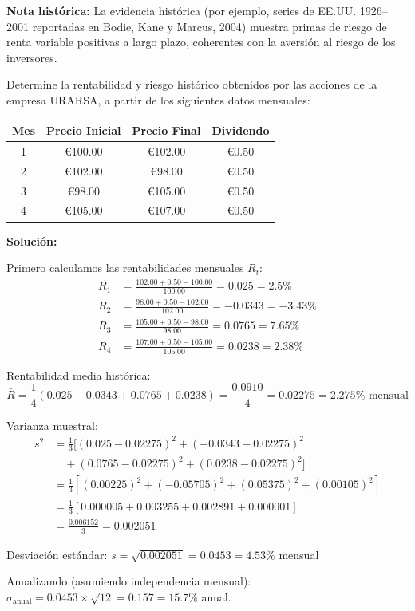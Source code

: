 \textbf{Nota histórica:} La evidencia histórica (por ejemplo, series de EE.UU. 1926--2001 reportadas en Bodie, Kane y Marcus, 2004) muestra primas de riesgo de renta variable positivas a largo plazo, coherentes con la aversión al riesgo de los inversores.

\begin{ejemplo}
Determine la rentabilidad y riesgo histórico obtenidos por las acciones de la empresa URARSA, a partir de los siguientes datos mensuales:

\begin{center}
\begin{tabular}{cccc}
\toprule
Mes & Precio Inicial & Precio Final & Dividendo \\
\midrule
1 & €100.00 & €102.00 & €0.50 \\
2 & €102.00 & €98.00 & €0.50 \\
3 & €98.00 & €105.00 & €0.50 \\
4 & €105.00 & €107.00 & €0.50 \\
\bottomrule
\end{tabular}
\end{center}

\textbf{Solución:}

Primero calculamos las rentabilidades mensuales $R_t$:
\begin{align*}
R_1 &= \frac{102.00 + 0.50 - 100.00}{100.00} = 0.025 = 2.5\% \\
R_2 &= \frac{98.00 + 0.50 - 102.00}{102.00} = -0.0343 = -3.43\% \\
R_3 &= \frac{105.00 + 0.50 - 98.00}{98.00} = 0.0765 = 7.65\% \\
R_4 &= \frac{107.00 + 0.50 - 105.00}{105.00} = 0.0238 = 2.38\%
\end{align*}

Rentabilidad media histórica:
$$\bar{R} = \frac{1}{4}(0.025 - 0.0343 + 0.0765 + 0.0238) = \frac{0.0910}{4} = 0.02275 = 2.275\% \text{ mensual}$$

Varianza muestral:
\begin{align*}
s^2 &= \frac{1}{3}[(0.025 - 0.02275)^2 + (-0.0343 - 0.02275)^2 \\
&\quad + (0.0765 - 0.02275)^2 + (0.0238 - 0.02275)^2] \\
&= \frac{1}{3}[(0.00225)^2 + (-0.05705)^2 + (0.05375)^2 + (0.00105)^2] \\
&= \frac{1}{3}[0.000005 + 0.003255 + 0.002891 + 0.000001] \\
&= \frac{0.006152}{3} = 0.002051
\end{align*}

Desviación estándar: $s = \sqrt{0.002051} = 0.0453 = 4.53\%$ mensual

Anualizando (asumiendo independencia mensual): $\sigma_{\text{anual}} = 0.0453 \times \sqrt{12} = 0.157 = 15.7\%$ anual.
\end{ejemplo}

